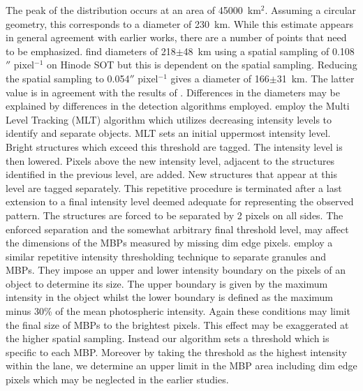 \documentclass{emulateapj}
\begin{document}
The peak of the distribution occurs at an area of 45000~km$^{2}$.  Assuming a circular geometry, this corresponds to a diameter of 230~km.  %
While this estimate appears in general agreement with earlier works, there are a number of points that need to be emphasized.\cite{Utz09} find diameters of 218$\pm$48~km using a spatial sampling of 0.108$''$ pixel$^{-1}$ on Hinode SOT but this is dependent on the spatial sampling. Reducing the spatial sampling to 0.054$''$ pixel$^{-1}$ gives a diameter of 166$\pm$31~km. The latter value is in agreement with the results of \cite{Wie04}.  Differences in the diameters may be explained by differences in the detection algorithms employed.
\cite{Wie04} employ the Multi Level Tracking (MLT) algorithm which utilizes  decreasing intensity levels to identify and separate objects. MLT sets an initial uppermost intensity level. Bright structures which exceed this threshold are tagged. The intensity level is then lowered. Pixels above the new intensity level, adjacent to the structures identified in the previous level, are added. New structures that appear at this level are tagged separately. This repetitive procedure is terminated after a last extension to a final intensity level deemed adequate for representing the observed pattern. The structures are forced to be separated by 2 pixels on all sides. The enforced separation and the somewhat arbitrary final threshold level, may affect the dimensions of the MBPs measured by missing dim edge pixels. \cite{Utz09} employ a similar repetitive intensity thresholding technique to separate granules and MBPs. They impose an upper and lower intensity boundary on the pixels of an object to determine its size. The upper boundary is given by the maximum intensity in the object whilst the lower boundary is defined as the maximum minus 30\% of the mean photospheric intensity.  Again these conditions may limit the final size of MBPs to the brightest pixels. This effect may be exaggerated at the higher spatial sampling.   
Instead our algorithm sets a threshold which is specific to each MBP. Moreover by taking the threshold as the highest intensity within the lane, we determine an upper limit in the MBP area 
including dim edge pixels which may be neglected in the earlier studies.
\end{document}
